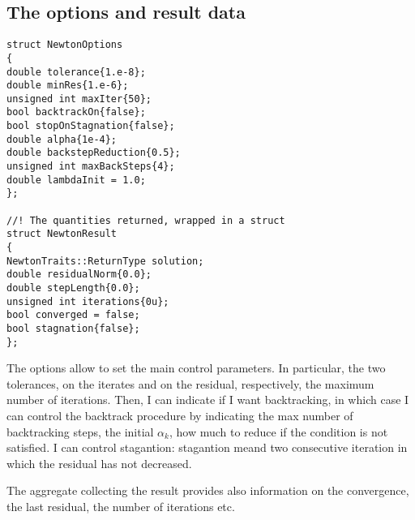 \documentclass{article}
\begin{document}
\subsection{The options and result data}
\begin{lstlisting}
struct NewtonOptions
{
double tolerance{1.e-8};
double minRes{1.e-6};
unsigned int maxIter{50};
bool backtrackOn{false};
bool stopOnStagnation{false};
double alpha{1e-4};
double backstepReduction{0.5};
unsigned int maxBackSteps{4};
double lambdaInit = 1.0;
};

//! The quantities returned, wrapped in a struct
struct NewtonResult
{
NewtonTraits::ReturnType solution;
double residualNorm{0.0};
double stepLength{0.0};
unsigned int iterations{0u};
bool converged = false;
bool stagnation{false};
};
\end{lstlisting}

The options allow to set the main control parameters. In particular, the two tolerances, on the iterates and on the residual, respectively, the maximum number of iterations. Then, I can indicate if I want backtracking, in which case I can control the backtrack procedure by indicating the max number of backtracking steps, the initial $\alpha_k$, how much to reduce if the condition is not satisfied. I can control stagantion: stagantion meand two consecutive iteration in which the residual has not decreased.

The aggregate collecting the result provides also information on the convergence, the last residual, the number of iterations etc.
\end{document}
